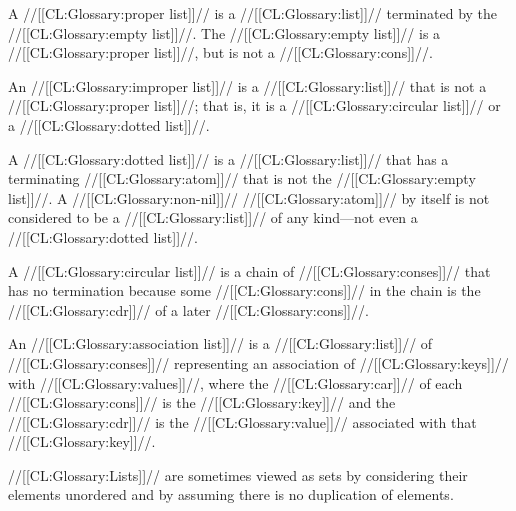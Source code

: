A //[[CL:Glossary:proper list]]// is a //[[CL:Glossary:list]]// terminated by the //[[CL:Glossary:empty list]]//.
The //[[CL:Glossary:empty list]]// is a //[[CL:Glossary:proper list]]//, but is not a //[[CL:Glossary:cons]]//.

An //[[CL:Glossary:improper list]]// is a //[[CL:Glossary:list]]// that is not a //[[CL:Glossary:proper list]]//;
that is, it is a //[[CL:Glossary:circular list]]// or a //[[CL:Glossary:dotted list]]//.

A //[[CL:Glossary:dotted list]]// is a //[[CL:Glossary:list]]// that has a terminating //[[CL:Glossary:atom]]//
that is not the //[[CL:Glossary:empty list]]//.  A //[[CL:Glossary:non-nil]]// //[[CL:Glossary:atom]]// by itself
is not considered to be a //[[CL:Glossary:list]]// of any kind---not even a //[[CL:Glossary:dotted list]]//.

A //[[CL:Glossary:circular list]]// is a chain of //[[CL:Glossary:conses]]// that has no termination 
because some //[[CL:Glossary:cons]]// in the chain is the //[[CL:Glossary:cdr]]// of a later //[[CL:Glossary:cons]]//.

 

An //[[CL:Glossary:association list]]// is a //[[CL:Glossary:list]]// of //[[CL:Glossary:conses]]// 
representing an association of //[[CL:Glossary:keys]]// with //[[CL:Glossary:values]]//, 
where the //[[CL:Glossary:car]]// of each //[[CL:Glossary:cons]]// is the //[[CL:Glossary:key]]// 
and the //[[CL:Glossary:cdr]]// is the //[[CL:Glossary:value]]// associated with that //[[CL:Glossary:key]]//.


\endsubsubsection%


//[[CL:Glossary:Lists]]// are sometimes viewed as sets by considering their elements
unordered and by assuming there is no duplication of elements.


